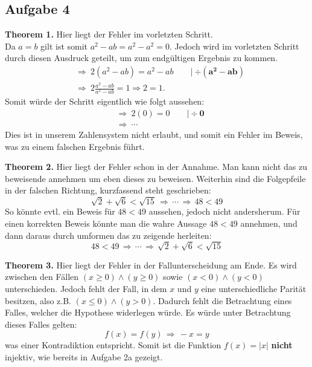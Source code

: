 \documentclass[a4paper,graphics,11pt]{article}
\newcommand\aufgabe[1]{\subsection*{Aufgabe #1}}
\begin{document}
\aufgabe{4}
   \begin{tasks}
       \task[] \textbf{Theorem 1.} Hier liegt der Fehler im vorletzten Schritt.\\
            Da $a=b$ gilt ist somit $a^2-ab = a^2-a^2 = 0$. Jedoch wird im vorletzten
            Schritt durch diesen Ausdruck geteilt, um zum endgültigen Ergebnis zu kommen.
            \begin{align*}
                & \Longrightarrow\ 2(a^2-ab) = a^2 - ab\qquad \vert\ \mathbf{\div (a^2-ab)}\\
                & \Longrightarrow\ 2\frac{a^2-ab}{a^2-ab} = 1 \Longrightarrow 2=1.
            \end{align*}
            Somit würde der Schritt eigentlich wie folgt aussehen:
            \begin{align*}
                & \Longrightarrow\ 2(0) = 0\qquad \vert \div \mathbf{0}\\
                & \Longrightarrow\ \cdots
            \end{align*}
            Dies ist in unserem Zahlensystem nicht erlaubt, und somit ein Fehler
            im Beweis, was zu einem falschen Ergebnis führt.

        \task[]\textbf{Theorem 2.} Hier liegt der Fehler schon in der Annahme.
            Man kann nicht das zu beweisende annehmen um eben dieses zu beweisen.
            Weiterhin sind die Folgepfeile in der falschen Richtung, kurzfassend
            steht geschrieben:
            $$
                \sqrt{2} + \sqrt{6} < \sqrt{15} \,\Longrightarrow\,
                \cdots \,\Longrightarrow\,
                48 <49
            $$
            So könnte evtl. ein Beweis für $48 < 49$ aussehen, jedoch nicht andersherum.
            Für einen korrekten Beweis könnte man die wahre Aussage $48 < 49$ annehmen,
            und dann daraus durch umformen das zu zeigende herleiten:
            $$
                48 <49 \,\Longrightarrow\,
                \cdots \,\Longrightarrow\,
                \sqrt{2} + \sqrt{6} < \sqrt{15}
            $$

        \task[]\textbf{Theorem 3.} Hier liegt der Fehler in der Fallunterscheidung
            am Ende. Es wird zwischen den Fällen $(x\geq0) \land (y\geq0)$ sowie
            $(x<0) \land (y<0)$ unterschieden. Jedoch fehlt der Fall, in dem $x$ und 
            $y$ eine unterschiedliche Parität besitzen, also z.B. $(x\leq0) \land (y>0)$.
            Dadurch fehlt die Betrachtung eines Falles, welcher die Hypothese widerlegen
            würde. Es würde unter Betrachtung dieses Falles gelten:
            $$
                f(x) = f(y) \,\Longrightarrow\, -x = y
            $$
            was einer Kontradiktion entspricht. Somit ist die Funktion
            $f(x) = \vert x\vert$ \textbf{nicht} injektiv, wie bereits in Aufgabe 2a
            gezeigt.
   \end{tasks}
\end{document}
